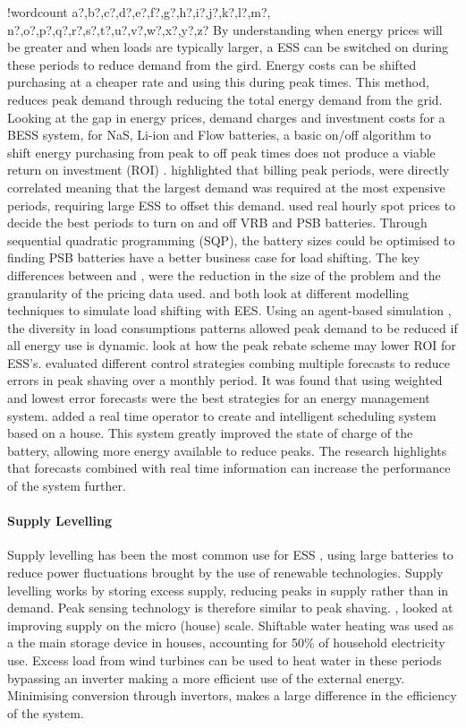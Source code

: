 \documentclass[10pt]{article}
\let\oldparagraph\paragraph
\renewcommand{\paragraph}[1]{\oldparagraph{#1}\mbox{}}
\newcounter{words}
\newenvironment{counted}{%
  \setcounter{words}{0}
  \SearchList!{wordcount}{\stepcounter{words}}
    {a?,b?,c?,d?,e?,f?,g?,h?,i?,j?,k?,l?,m?,
    n?,o?,p?,q?,r?,s?,t?,u?,v?,w?,x?,y?,z?}
  \UndoBoundary{'}
  \SearchOrder{p;}}{%
  \StopSearching}
\begin{document}
\begin{counted}
By understanding when energy prices will be greater and when loads are
typically larger, a ESS can be switched on during these periods to
reduce demand from the gird. Energy costs can be shifted purchasing at a
cheaper rate and using this during peak times. This method, reduces peak
demand through reducing the total energy demand from the grid. Looking
at the gap in energy prices, demand charges and investment costs for a
BESS system, for NaS, Li-ion and Flow batteries, a basic on/off
algorithm to shift energy purchasing from peak to off peak times does
not produce a viable return on investment (ROI) \cite{7555795}.
\cite{7555793} highlighted that billing peak periods, were directly
correlated meaning that the largest demand was required at the most
expensive periods, requiring large ESS to offset this demand.
\cite{5590194} used real hourly spot prices to decide the best periods
to turn on and off VRB and PSB batteries. Through sequential quadratic
programming (SQP), the battery sizes could be optimised to finding PSB
batteries have a better business case for load shifting. The key
differences between \cite{5590194} and \cite{7555795}, were the
reduction in the size of the problem and the granularity of the pricing
data used. \cite{shen2016} and \cite{6461115} both look at different
modelling techniques to simulate load shifting with EES. Using an
agent-based simulation \cite{6461115}, the diversity in load
consumptions patterns allowed peak demand to be reduced if all energy
use is dynamic. \cite{shen2016} look at how the peak rebate scheme may
lower ROI for ESS's. \cite{6938948} evaluated different control
strategies combing multiple forecasts to reduce errors in peak shaving
over a monthly period. It was found that using weighted and lowest error
forecasts were the best strategies for an energy management system.
\cite{Bennett2015122} added a real time operator to create and
intelligent scheduling system based on a house. This system greatly
improved the state of charge of the battery, allowing more energy
available to reduce peaks. The research highlights that forecasts
combined with real time information can increase the performance of the
system further.

\paragraph{Supply Levelling}\label{supply-levelling}

Supply levelling has been the most common use for ESS
\cite{iearoadmapes}, using large batteries to reduce power fluctuations
brought by the use of renewable technologies. Supply levelling works by
storing excess supply, reducing peaks in supply rather than in demand.
Peak sensing technology is therefore similar to peak shaving.
\cite{Allik20161116}, looked at improving supply on the micro (house)
scale. Shiftable water heating was used as a the main storage device in
houses, accounting for 50\% of household electricity use. Excess load
from wind turbines can be used to heat water in these periods bypassing
an inverter making a more efficient use of the external energy.
Minimising conversion through invertors, makes a large difference in the
efficiency of the system.


\end{counted}
\end{document}
